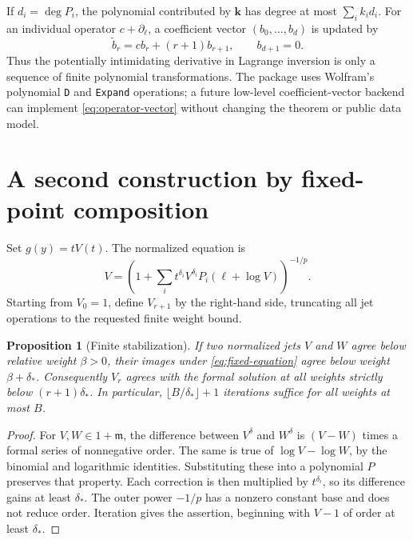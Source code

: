 \documentclass[11pt,a4paper]{article}
\numberwithin{equation}{section}
\newtheorem{proposition}[theorem]{Proposition}
\theoremstyle{definition}\newtheorem{definition}[theorem]{Definition}
\theoremstyle{remark}\newtheorem{remark}[theorem]{Remark}
\newcommand{\D}{\partial_\ell}
\newcommand{\code}[1]{\texttt{#1}}
\begin{document}
If $d_i=\deg P_i$, the polynomial contributed by $\bm k$ has degree at
most $\sum_i k_i d_i$. For an individual operator $c+\D$, a coefficient
vector $(b_0,\ldots,b_d)$ is updated by
\begin{equation}
 \widetilde b_r=c b_r+(r+1)b_{r+1},\qquad b_{d+1}=0.
 \label{eq:operator-vector}
\end{equation}
Thus the potentially intimidating derivative in Lagrange inversion is
only a sequence of finite polynomial transformations. The package uses
Wolfram's polynomial \code{D} and \code{Expand} operations; a future
low-level coefficient-vector backend can implement
\cref{eq:operator-vector} without changing the theorem or public data
model.

\section{A second construction by fixed-point composition}
\label{sec:fixed}

Set $g(y)=tV(t)$. The normalized equation is
\begin{equation}
 V=\left(1+\sum_i t^{\delta_i}V^{\delta_i}
          P_i(\ell+\log V)\right)^{-1/p}.
 \label{eq:fixed-equation}
\end{equation}
Starting from $V_0=1$, define $V_{r+1}$ by the right-hand side, truncating
all jet operations to the requested finite weight bound.

\begin{proposition}[Finite stabilization]
\label{prop:fixed}
If two normalized jets $V$ and $W$ agree below relative weight $\beta>0$,
their images under \cref{eq:fixed-equation} agree below weight
$\beta+\delta_*$. Consequently $V_r$ agrees with the formal solution at
all weights strictly below $(r+1)\delta_*$. In particular,
$\lfloor B/\delta_*\rfloor+1$ iterations suffice for all weights at most
$B$.
\end{proposition}

\begin{proof}
For $V,W\in1+\mathfrak m$, the difference between $V^\delta$ and
$W^\delta$ is $(V-W)$ times a formal series of nonnegative order. The same
is true of $\log V-\log W$, by the binomial and logarithmic identities.
Substituting these into a polynomial $P$ preserves that property. Each
correction is then multiplied by $t^{\delta_i}$, so its difference gains
at least $\delta_*$. The outer power $-1/p$ has a nonzero constant base
and does not reduce order. Iteration gives the assertion, beginning with
$V-1$ of order at least $\delta_*$.
\end{proof}
\end{document}
